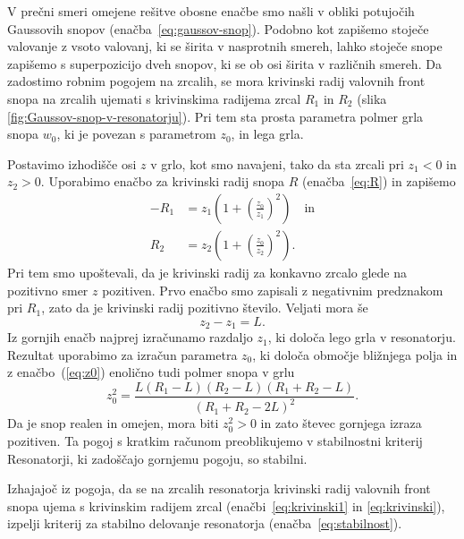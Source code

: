 V prečni smeri omejene rešitve obosne enačbe smo našli v obliki potujočih
Gaussovih snopov (enačba~\ref{eq:gaussov-snop}). 
Podobno kot zapišemo stoječe valovanje z vsoto valovanj, ki se širita v nasprotnih smereh,
lahko stoječe snope zapišemo s superpozicijo dveh snopov, ki se ob osi širita v različnih smereh. 
Da zadostimo robnim pogojem na zrcalih, se mora krivinski radij valovnih front 
snopa na zrcalih ujemati s krivinskima radijema zrcal $R_{1}$ in $R_{2}$ 
(slika \ref{fig:Gaussov-snop-v-resonatorju}).
Pri tem sta prosta parametra polmer grla snopa $w_0$, 
ki je povezan s parametrom $z_{0}$, in lega grla. 

Postavimo izhodišče osi $z$ v grlo, kot smo
navajeni, tako da sta zrcali pri $z_{1}<0$ in $z_{2}>0$. Uporabimo enačbo
za krivinski radij snopa $R$ (enačba~\ref{eq:R})  in zapišemo 
\begin{align}
-R_{1} & =  z_{1}\left(1+\left(\frac{z_{0}}{z_{1}}\right)^{2}\right) \quad  \label{eq:krivinski1} \textrm{in}\\
R_{2}  &=  z_{2}\left(1+\left(\frac{z_{0}}{z_{2}}\right)^{2}\right).
\label{eq:krivinski}
\end{align}
Pri tem smo upoštevali, da je krivinski radij za konkavno zrcalo glede na 
pozitivno smer $z$ pozitiven. Prvo enačbo smo zapisali z negativnim 
predznakom pri $R_1$, zato da je krivinski radij pozitivno število.
Veljati mora še 
\begin{equation}
z_{2}-z_{1}=L.
\label{eq:razlikaz}
\end{equation}
Iz gornjih enačb najprej izračunamo razdaljo $z_{1}$, ki določa
lego grla v resonatorju. Rezultat uporabimo za izračun parametra $z_{0}$, ki določa
območje bližnjega polja in z enačbo~(\ref{eq:z0}) enolično tudi polmer snopa v grlu
\begin{equation}
z_{0}^{2}=\frac{L(R_{1}-L)(R_{2}-L)(R_{1}+R_{2}-L)}{(R_{1}+R_{2}-2L)^{2}}.
\label{eq:z0_stab}
\end{equation}
Da je snop realen in omejen, mora biti $z_{0}^{2}>0$ in zato števec
gornjega izraza pozitiven. Ta pogoj s kratkim računom preoblikujemo
v stabilnostni kriterij
Resonatorji, ki zadoščajo gornjemu pogoju, so stabilni. 

\begin{definition}
Izhajajoč iz pogoja, da se na zrcalih resonatorja krivinski radij valovnih front snopa ujema s krivinskim
radijem zrcal (enačbi~\ref{eq:krivinski1} in \ref{eq:krivinski}), izpelji 
kriterij za stabilno delovanje resonatorja 
(enačba~\ref{eq:stabilnost}).
\end{definition}


